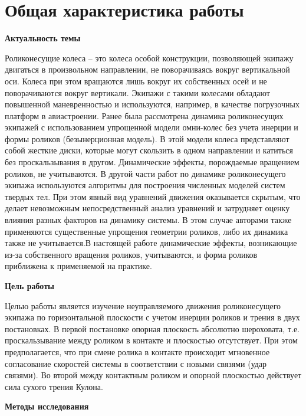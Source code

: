 
\section*{Общая характеристика работы}

\textbf{Актуальность темы}

Роликонесущие колеса – это колеса особой конструкции, позволяющей экипажу двигаться в произвольном направлении, не поворачиваясь вокруг вертикальной оси. Колеса при этом вращаются лишь вокруг их собственных осей и не поворачиваются вокруг вертикали. Экипажи с такими колесами обладают повышенной маневренностью и используются, например, в качестве погрузочных платформ в авиастроении. Ранее была рассмотрена динамика роликонесущих экипажей с использованием упрощенной модели омни-колес без учета инерции и формы роликов (безынерционная модель). В этой модели колеса  представляют собой жесткие диски, которые могут скользить в одном направлении и катиться без проскальзывания в другом. Динамические эффекты, порождаемые вращением роликов, не учитываются. В другой части работ по динамике роликонесущего экипажа используются  алгоритмы для построения численных моделей систем твердых тел. При этом явный вид уравнений движения оказывается скрытым, что делает невозможным непосредственный анализ уравнений и затрудняет оценку влияния разных факторов на динамику системы. В этом случае авторами также применяются существенные упрощения геометрии роликов, либо их динамика также не учитывается.В настоящей работе динамические эффекты, возникающие из-за собственного вращения роликов, учитываются, и форма роликов приближена к применяемой на практике.

\textbf{Цель работы}

Целью работы является изучение неуправляемого движения роликонесущего экипажа по горизонтальной плоскости с учетом инерции роликов и трения в двух постановках. В первой постановке опорная плоскость абсолютно шероховата, т.е. проскальзывание между роликом в контакте и плоскостью отсутствует. При этом предполагается, что при смене ролика в контакте происходит мгновенное согласование скоростей системы в соответствии с новыми связями (удар связями). Во второй между контактным роликом и опорной плоскостью действует сила сухого трения Кулона. 

\textbf{Методы исследования}

